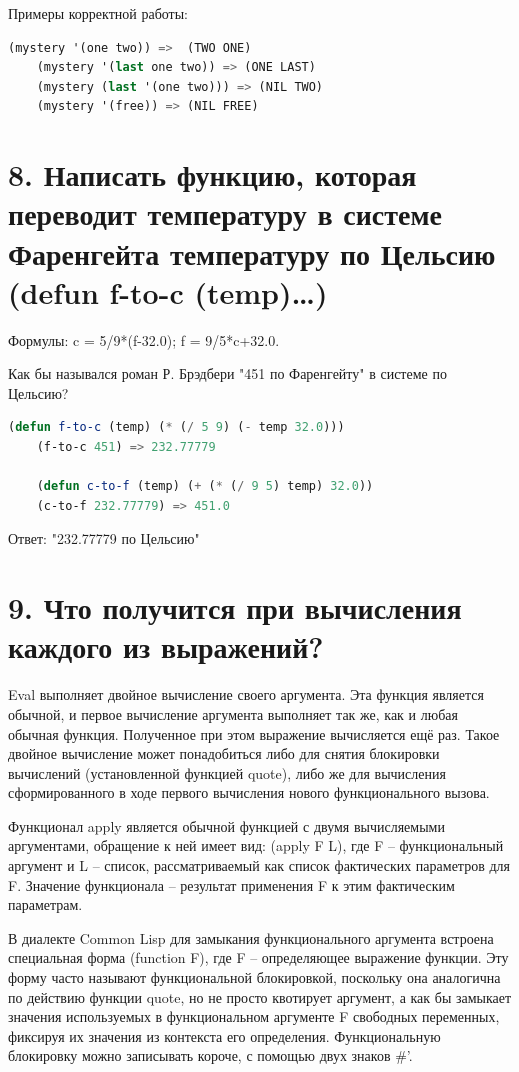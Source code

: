 \documentclass[12pt]{report}
\begin{document}
Примеры корректной работы:
\begin{lstlisting}[language=Lisp]
	(mystery '(one two)) =>  (TWO ONE)
	(mystery '(last one two)) => (ONE LAST)
	(mystery (last '(one two))) => (NIL TWO)
	(mystery '(free)) => (NIL FREE)
\end{lstlisting}

\section*{8. Написать функцию, которая переводит температуру в системе Фаренгейта температуру по Цельсию (defun f-to-c (temp)…)}

Формулы: c = 5/9*(f-32.0); f = 9/5*c+32.0. 

Как бы назывался роман Р. Брэдбери "451 по Фаренгейту" в системе по Цельсию?

\begin{lstlisting}[language=Lisp]
	(defun f-to-c (temp) (* (/ 5 9) (- temp 32.0)))
	(f-to-c 451) => 232.77779
	
	(defun c-to-f (temp) (+ (* (/ 9 5) temp) 32.0))
	(c-to-f 232.77779) => 451.0
\end{lstlisting}

Ответ: "232.77779 по Цельсию"

\section*{9. Что получится при вычисления каждого из выражений?}

Eval выполняет двойное  вычисление своего аргумента. Эта функция является обычной, и первое  вычисление аргумента выполняет так же, как и любая обычная функция.  Полученное при этом выражение вычисляется ещё раз. Такое двойное  вычисление может понадобиться либо для снятия блокировки вычислений (установленной функцией quote), либо же для вычисления сформированного в ходе первого вычисления нового функционального вызова.
 
Функционал apply является обычной функцией с двумя  вычисляемыми аргументами, обращение к ней имеет вид: (apply F L), где F – функциональный аргумент и L – список, рассматриваемый как список фактических параметров для F. Значение функционала – результат применения F к этим фактическим параметрам.

В диалекте Common Lisp для замыкания функционального аргумента встроена специальная форма (function F), где F – определяющее  выражение функции. Эту форму часто называют функциональной  блокировкой, поскольку она аналогична по действию функции quote, но  не просто квотирует аргумент, а как бы замыкает значения используемых  в функциональном аргументе F свободных переменных, фиксируя их  значения из контекста его определения. Функциональную блокировку  можно записывать короче, с помощью двух знаков \#'.
 
\end{document}
